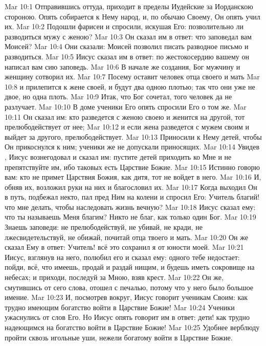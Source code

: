 \vs Mar 10:1 Отправившись оттуда, приходит в пределы Иудейские за Иорданскою стороною. Опять собирается к Нему народ, и, по обычаю Своему, Он опять учил их.
\vs Mar 10:2 Подошли фарисеи и спросили, искушая Его: позволительно ли разводиться мужу с женою?
\vs Mar 10:3 Он сказал им в ответ: что заповедал вам Моисей?
\vs Mar 10:4 Они сказали: Моисей позволил писать разводное письмо и разводиться.
\vs Mar 10:5 Иисус сказал им в ответ: по жестокосердию вашему он написал вам сию заповедь.
\vs Mar 10:6 В начале же создания, Бог мужчину и женщину сотворил их.
\vs Mar 10:7 Посему оставит человек отца своего и мать
\vs Mar 10:8 и прилепится к жене своей, и будут два одною плотью; так что они уже не двое, но одна плоть.
\vs Mar 10:9 Итак, что Бог сочетал, того человек да не разлучает.
\vs Mar 10:10 В доме ученики Его опять спросили Его о том же.
\vs Mar 10:11 Он сказал им: кто разведется с женою своею и женится на другой, тот прелюбодействует от нее;
\vs Mar 10:12 и если жена разведется с мужем своим и выйдет за другого, прелюбодействует.
\rsbpar\vs Mar 10:13 Приносили к Нему детей, чтобы Он прикоснулся к ним; ученики же не допускали приносящих.
\vs Mar 10:14 Увидев , Иисус вознегодовал и сказал им: пустите детей приходить ко Мне и не препятствуйте им, ибо таковых есть Царствие Божие.
\vs Mar 10:15 Истинно говорю вам: кто не примет Царствия Божия, как дитя, тот не войдет в него.
\vs Mar 10:16 И, обняв их, возложил руки на них и благословил их.
\rsbpar\vs Mar 10:17 Когда выходил Он в путь, подбежал некто, пал пред Ним на колени и спросил Его: Учитель благий! что мне делать, чтобы наследовать жизнь вечную?
\vs Mar 10:18 Иисус сказал ему: что ты называешь Меня благим? Никто не благ, как только один Бог.
\vs Mar 10:19 Знаешь заповеди: не прелюбодействуй, не убивай, не кради, не лжесвидетельствуй, не обижай, почитай отца твоего и мать.
\vs Mar 10:20 Он же сказал Ему в ответ: Учитель! всё это сохранил я от юности моей.
\vs Mar 10:21 Иисус, взглянув на него, полюбил его и сказал ему: одного тебе недостает: пойди, всё, что имеешь, продай и раздай нищим, и будешь иметь сокровище на небесах; и приходи, последуй за Мною, взяв крест.
\vs Mar 10:22 Он же, смутившись от сего слова, отошел с печалью, потому что у него было большое имение.
\vs Mar 10:23 И, посмотрев вокруг, Иисус говорит ученикам Своим: как трудно имеющим богатство войти в Царствие Божие!
\vs Mar 10:24 Ученики ужаснулись от слов Его. Но Иисус опять говорит им в ответ: дети! как трудно надеющимся на богатство войти в Царствие Божие!
\vs Mar 10:25 Удобнее верблюду пройти сквозь игольные уши, нежели богатому войти в Царствие Божие.
